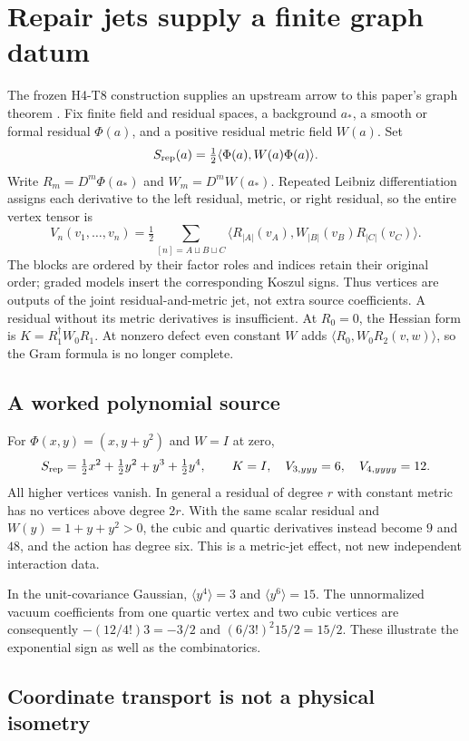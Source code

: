 \documentclass[11pt,a4paper]{article}
\begin{document}
\section{Repair jets supply a finite graph datum}
\label{sec:repair-jets}

The frozen H4-T8 construction supplies an upstream arrow to this paper's
graph theorem \cite{FrozenRepairJet}. Fix finite field and residual spaces,
a background $a_*$, a smooth or formal residual $\Phi(a)$, and a positive
residual metric field $W(a)$. Set
\[
 S_{\rm rep}(a)=\tfrac12\langle\Phi(a),W(a)\Phi(a)\rangle.
\]
Write $R_m=D^m\Phi(a_*)$ and $W_m=D^mW(a_*)$. Repeated Leibniz
differentiation assigns each derivative to the left residual, metric, or
right residual, so the entire vertex tensor is
\[
 V_n(v_1,\ldots,v_n)=\tfrac12
 \sum_{[n]=A\sqcup B\sqcup C}
 \langle R_{|A|}(v_A),W_{|B|}(v_B)R_{|C|}(v_C)\rangle.
\]
The blocks are ordered by their factor roles and indices retain their
original order; graded models insert the corresponding Koszul signs.
Thus vertices are outputs of the joint residual-and-metric jet, not extra
source coefficients. A residual without its metric derivatives is insufficient.
At $R_0=0$, the Hessian form is $K=R_1^\dagger W_0R_1$.
At nonzero defect even constant $W$ adds
$\langle R_0,W_0R_2(v,w)\rangle$, so the Gram formula is no longer complete.

\subsection{A worked polynomial source}
\label{sec:repair-example}

For $\Phi(x,y)=(x,y+y^2)$ and $W=I$ at zero,
\[
 S_{\rm rep}=\tfrac12x^2+\tfrac12y^2+y^3+\tfrac12y^4,
 \qquad K=I,\quad V_{3,yyy}=6,\quad V_{4,yyyy}=12.
\]
All higher vertices vanish. In general a residual of degree $r$ with
constant metric has no vertices above degree $2r$. With the same scalar
residual and $W(y)=1+y+y^2>0$, the cubic and quartic derivatives instead
become $9$ and $48$, and the action has degree six. This is a metric-jet
effect, not new independent interaction data.

In the unit-covariance Gaussian, $\langle y^4\rangle=3$ and
$\langle y^6\rangle=15$. The unnormalized vacuum coefficients from one
quartic vertex and two cubic vertices are consequently
$-(12/4!)3=-3/2$ and $(6/3!)^2 15/2=15/2$.
These illustrate the exponential sign as well as the combinatorics.

\subsection{Coordinate transport is not a physical isometry}
\label{sec:repair-transport}
\end{document}
